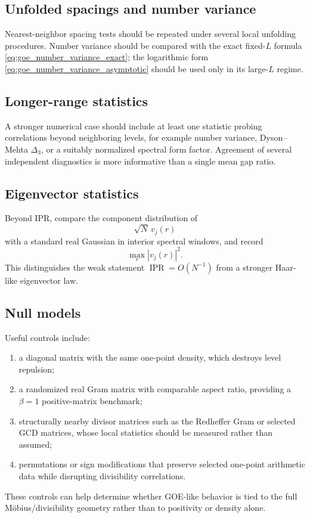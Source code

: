 \documentclass[11pt]{amsart}
\numberwithin{equation}{section}
\theoremstyle{plain}
\theoremstyle{definition}
\theoremstyle{remark}
\newcommand{\IPR}{\operatorname{IPR}}
\begin{document}
\subsection{Unfolded spacings and number variance}
\label{subsec:spacing_number_protocol}

Nearest-neighbor spacing tests should be repeated under several local unfolding procedures.  Number variance should be compared with the exact fixed-$L$ formula \eqref{eq:goe_number_variance_exact}; the logarithmic form \eqref{eq:goe_number_variance_asymptotic} should be used only in its large-$L$ regime.

\subsection{Longer-range statistics}
\label{subsec:long_range_protocol}

A stronger numerical case should include at least one statistic probing correlations beyond neighboring levels, for example number variance, Dyson--Mehta $\Delta_3$, or a suitably normalized spectral form factor.  Agreement of several independent diagnostics is more informative than a single mean gap ratio.

\subsection{Eigenvector statistics}
\label{subsec:eigenvector_protocol}

Beyond IPR, compare the component distribution of
\begin{equation}
\sqrt N\,v_j(r)
\label{eq:scaled_eigenvector_component}
\end{equation}
with a standard real Gaussian in interior spectral windows, and record
\begin{equation}
\max_r |v_j(r)|^2.
\label{eq:eigenvector_sup_norm}
\end{equation}
This distinguishes the weak statement $\IPR=O(N^{-1})$ from a stronger Haar-like eigenvector law.

\subsection{Null models}
\label{subsec:null_models}

Useful controls include:
\begin{enumerate}[label=(\roman*)]
\item a diagonal matrix with the same one-point density, which destroys level repulsion;
\item a randomized real Gram matrix with comparable aspect ratio, providing a $\beta=1$ positive-matrix benchmark;
\item structurally nearby divisor matrices such as the Redheffer Gram or selected GCD matrices, whose local statistics should be measured rather than assumed;
\item permutations or sign modifications that preserve selected one-point arithmetic data while disrupting divisibility correlations.
\end{enumerate}
These controls can help determine whether GOE-like behavior is tied to the full M\"obius/divisibility geometry rather than to positivity or density alone.
\end{document}
